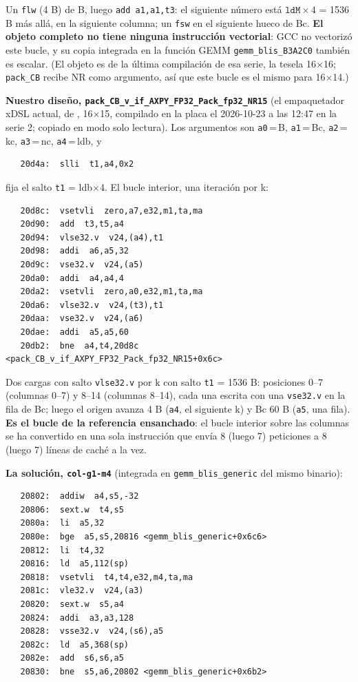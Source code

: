 \documentclass[10pt,a4paper]{article}
\begin{document}
Un \texttt{flw} (4 B) de B, luego \texttt{add a1,a1,t3}: el siguiente número está $\texttt{ldM}\times4$ = 1536 B más allá, en la
siguiente columna; un \texttt{fsw} en el siguiente hueco de Bc. \textbf{El objeto completo no tiene ninguna instrucción vectorial}: GCC
no vectorizó este bucle, y su copia integrada en la función GEMM \texttt{gemm\_blis\_B3A2C0} también es escalar. (El objeto es de la
última compilación de esa serie, la tesela 16$\times$16; \texttt{pack\_CB} recibe NR como argumento, así que este bucle es el mismo para
16$\times$14.)

\textbf{Nuestro diseño, \texttt{pack\_CB\_v\_if\_AXPY\_FP32\_Pack\_fp32\_NR15}} (el empaquetador xDSL actual, de
, 16$\times$15, compilado en la placa el 2026-10-23 a las 12:47 en la serie 2; copiado en
modo solo lectura). Los argumentos son \texttt{a0}\,=\,B, \texttt{a1}\,=\,Bc, \texttt{a2}\,=\,kc, \texttt{a3}\,=\,nc,
\texttt{a4}\,=\,ldb, y
{\footnotesize\begin{verbatim}
   20d4a:  slli  t1,a4,0x2
\end{verbatim}}
fija el salto \texttt{t1} = ldb$\times$4. El bucle interior, una iteración por k:
{\footnotesize\begin{verbatim}
   20d8c:  vsetvli  zero,a7,e32,m1,ta,ma
   20d90:  add  t3,t5,a4
   20d94:  vlse32.v  v24,(a4),t1
   20d98:  addi  a6,a5,32
   20d9c:  vse32.v  v24,(a5)
   20da0:  addi  a4,a4,4
   20da2:  vsetvli  zero,a0,e32,m1,ta,ma
   20da6:  vlse32.v  v24,(t3),t1
   20daa:  vse32.v  v24,(a6)
   20dae:  addi  a5,a5,60
   20db2:  bne  a4,t4,20d8c <pack_CB_v_if_AXPY_FP32_Pack_fp32_NR15+0x6c>
\end{verbatim}}

Dos cargas con salto \texttt{vlse32.v} por k con salto \texttt{t1} = 1536 B: posiciones 0--7 (columnas 0--7) y 8--14 (columnas
8--14), cada una escrita con una \texttt{vse32.v} en la fila de Bc; luego el origen avanza 4 B (\texttt{a4}, el siguiente k) y Bc 60 B
(\texttt{a5}, una fila). \textbf{Es el bucle de la referencia ensanchado}: el bucle interior sobre las columnas se ha convertido en una
sola instrucción que envía 8 (luego 7) peticiones a 8 (luego 7) líneas de caché a la vez.

\textbf{La solución, \texttt{col-g1-m4}} (integrada en \texttt{gemm\_blis\_generic} del mismo binario):
{\footnotesize\begin{verbatim}
   20802:  addiw  a4,s5,-32
   20806:  sext.w  t4,s5
   2080a:  li  a5,32
   2080e:  bge  a5,s5,20816 <gemm_blis_generic+0x6c6>
   20812:  li  t4,32
   20816:  ld  a5,112(sp)
   20818:  vsetvli  t4,t4,e32,m4,ta,ma
   2081c:  vle32.v  v24,(a3)
   20820:  sext.w  s5,a4
   20824:  addi  a3,a3,128
   20828:  vsse32.v  v24,(s6),a5
   2082c:  ld  a5,368(sp)
   2082e:  add  s6,s6,a5
   20830:  bne  s5,a6,20802 <gemm_blis_generic+0x6b2>
\end{verbatim}}
\end{document}
